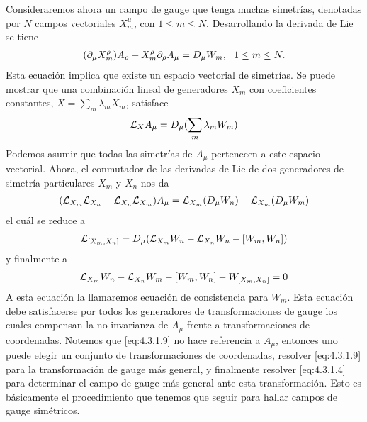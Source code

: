 Consideraremos ahora un campo de gauge que tenga muchas simetrías, denotadas por $N$ campos vectoriales $X^\mu_m$, con $1\leq m\leq N$. Desarrollando la derivada de Lie se tiene
\begin{align}
	(\pr_\mu X^\rho_m)A_\rho+X^\rho_m\pr_\rho A_\mu = D_\mu W_m, \ \ 1\leq m\leq N. \label{eq:4.3.1.6}
\end{align}
Esta ecuación implica que existe un espacio vectorial de simetrías. Se puede mostrar que una combinación lineal de generadores $X_m$ con coeficientes constantes, $X=\sum_m\lambda_m X_m$, satisface
\begin{align}
	\mathcal{L}_{X}A_\mu = D_\mu(\sum_m\lambda_m W_m)
\end{align}
Podemos asumir que todas las simetrías de $A_\mu$ pertenecen a este espacio vectorial. Ahora, el conmutador de las derivadas de Lie de dos generadores de simetría particulares $X_m$ y $X_n$ nos da
\begin{align}
	(\mathcal{L}_{X_m}\mathcal{L}_{X_n}-\mathcal{L}_{X_n}\mathcal{L}_{X_m})A_\mu = \mathcal{L}_{X_m}(D_\mu W_n)-\mathcal{L}_{X_m}(D_\mu W_m) \label{eq:4.3.1.7}
\end{align}
el cuál se reduce a
\begin{align}
	\mathcal{L}_{[X_m,X_n]} = D_\mu(\mathcal{L}_{X_m}W_n-\mathcal{L}_{X_n}W_n-[W_m,W_n]) \label{eq:4.3.1.8}
\end{align}
y finalmente a
\begin{align}
	\mathcal{L}_{X_m} W_n-\mathcal{L}_{X_n}W_m-[W_m,W_n]-W_{[X_m,X_n]} =0 \label{eq:4.3.1.9}
\end{align}
A esta ecuación la llamaremos ecuación de consistencia para $W_m$. Esta ecuación debe satisfacerse por todos los generadores de transformaciones de gauge los cuales compensan la no invarianza de $A_\mu$ frente a transformaciones de coordenadas. Notemos que \eqref{eq:4.3.1.9} no hace referencia a $A_\mu$, entonces uno puede elegir un conjunto de transformaciones de coordenadas, resolver \eqref{eq:4.3.1.9} para la transformación de gauge más general, y finalmente resolver \eqref{eq:4.3.1.4} para determinar el campo de gauge más general ante esta transformación. Esto es básicamente el procedimiento que tenemos que seguir para hallar campos de gauge simétricos.

